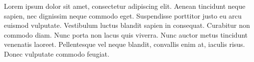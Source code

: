 \begin{cvSummary}
Lorem ipsum dolor sit amet, consectetur adipiscing elit. Aenean tincidunt neque sapien, nec dignissim neque commodo eget. Suspendisse porttitor justo eu arcu euismod vulputate. Vestibulum luctus blandit sapien in consequat. Curabitur non commodo diam. Nunc porta non lacus quis viverra. Nunc auctor metus tincidunt venenatis laoreet. Pellentesque vel neque blandit, convallis enim at, iaculis risus. Donec vulputate commodo feugiat.
\end{cvSummary}
